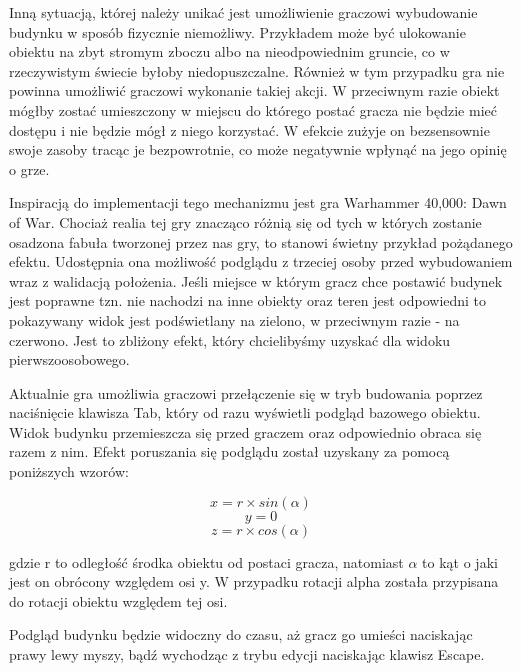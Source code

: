 Inną sytuacją, której należy unikać jest umożliwienie graczowi wybudowanie budynku w sposób fizycznie niemożliwy. Przykładem może być ulokowanie obiektu na zbyt stromym zboczu albo na nieodpowiednim gruncie, co w rzeczywistym świecie byłoby niedopuszczalne. Również w tym przypadku gra nie powinna umożliwić graczowi wykonanie takiej akcji. W przeciwnym razie obiekt mógłby zostać umieszczony w miejscu do którego postać gracza nie będzie mieć dostępu i nie będzie mógł z niego korzystać. W efekcie zużyje on bezsensownie swoje zasoby tracąc je bezpowrotnie, co może negatywnie wpłynąć na jego opinię o grze.

Inspiracją do implementacji tego mechanizmu jest gra Warhammer 40,000: Dawn of War. Chociaż realia tej gry znacząco różnią się od tych w których zostanie osadzona fabuła tworzonej przez nas gry, to stanowi świetny przykład pożądanego efektu. Udostępnia ona możliwość podglądu z trzeciej osoby przed wybudowaniem wraz z walidacją położenia. Jeśli miejsce w którym gracz chce postawić budynek jest poprawne tzn. nie nachodzi na inne obiekty oraz teren jest odpowiedni to pokazywany widok jest podświetlany na zielono, w przeciwnym razie - na czerwono. Jest to zbliżony efekt, który chcielibyśmy uzyskać dla widoku pierwszoosobowego.

Aktualnie gra umożliwia graczowi przełączenie się w tryb budowania poprzez naciśnięcie klawisza Tab, który od razu wyświetli podgląd bazowego obiektu. Widok budynku przemieszcza się przed graczem oraz odpowiednio obraca się razem z nim. Efekt poruszania się podglądu został uzyskany za pomocą poniższych wzorów:

$$ x = r \times sin(\alpha) $$
$$ y = 0 $$
$$ z = r \times cos(\alpha) $$

gdzie r to odległość środka obiektu od postaci gracza, natomiast $\alpha$ to kąt o jaki jest on obrócony względem osi y. W przypadku rotacji alpha została przypisana do rotacji obiektu względem tej osi.

Podgląd budynku będzie widoczny do czasu, aż gracz go umieści naciskając prawy lewy myszy, bądź wychodząc z trybu edycji naciskając klawisz Escape.
